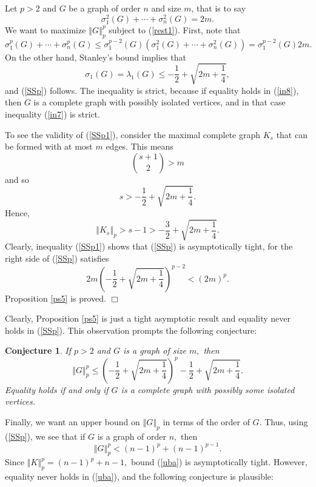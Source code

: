 \documentclass[12pt]{article}%
\newtheorem{conjecture}[theorem]{Conjecture}
\newenvironment{proof}[1][Proof]{\noindent{\textbf {#1}  }}  {\hfill$\Box$\bigskip}
\begin{document}
\begin{proof}
Let $p>2$ and $G$ be a graph of order $n$ and size $m$, that is to say
\begin{equation}
\sigma_{1}^{2}\left(  G\right)  +\cdots+\sigma_{n}^{2}\left(  G\right)  =2m.
\label{rest1}%
\end{equation}
We want to maximize $\left\Vert G\right\Vert _{p}^{p}$ subject to
(\ref{rest1}). First, note that
\begin{equation}
\sigma_{1}^{p}\left(  G\right)  +\cdots+\sigma_{n}^{p}\left(  G\right)
\leq\sigma_{1}^{p-2}\left(  G\right)  \left(  \sigma_{1}^{2}\left(  G\right)
+\cdots+\sigma_{n}^{2}\left(  G\right)  \right)  =\sigma_{1}^{p-2}\left(
G\right)  2m. \label{in7}%
\end{equation}
On the other hand, Stanley's bound \cite{Sta87} implies that
\begin{equation}
\sigma_{1}\left(  G\right)  =\lambda_{1}\left(  G\right)  \leq-\frac{1}%
{2}+\sqrt{2m+\frac{1}{4}}, \label{in8}%
\end{equation}
and (\ref{SSp}) follows. The inequality is strict, because if equality holds
in (\ref{in8}), then $G$ is a complete graph with possibly isolated vertices,
and in that case inequality (\ref{in7}) is strict.

To see the validity of (\ref{SSp1}), consider the maximal complete graph
$K_{s}$ that can be formed with at most $m$ edges. This means
\[
\binom{s+1}{2}>m
\]
and so%
\[
s>-\frac{1}{2}+\sqrt{2m+\frac{1}{4}}.
\]
Hence,
\[
\left\Vert K_{s}\right\Vert _{p}>s-1>-\frac{3}{2}+\sqrt{2m+\frac{1}{4}}.
\]
Clearly, inequality (\ref{SSp1}) shows that (\ref{SSp}) is asymptotically
tight, for the right side of (\ref{SSp}) satisfies
\[
2m\left(  -\frac{1}{2}+\sqrt{2m+\frac{1}{4}}\right)  ^{p-2}<\left(  2m\right)
^{p}.
\]
Proposition \ref{ps5} is proved.
\end{proof}

Clearly, Proposition \ref{ps5} is just a tight asymptotic result and equality
never holds in (\ref{SSp}). This observation prompts the following conjecture:

\begin{conjecture}
\label{con1}If $p>2$ and $G$ is a graph of size $m,$ then%
\[
\left\Vert G\right\Vert _{p}^{p}\leq\left(  -\frac{1}{2}+\sqrt{2m+\frac{1}{4}%
}\right)  ^{p}-\frac{1}{2}+\sqrt{2m+\frac{1}{4}}.
\]
Equality holds if and only if $G$ is a complete graph with possibly some
isolated vertices.
\end{conjecture}

Finally, we want an upper bound on $\left\Vert G\right\Vert _{p}$ in terms of
the order of $G.$ Thus, using (\ref{SSp}), we see that if $G$ is a graph of
order $n,$ then
\begin{equation}
\left\Vert G\right\Vert _{p}^{p}<\left(  n-1\right)  ^{p}+\left(  n-1\right)
^{p-1}. \label{uba}%
\end{equation}
Since $\left\Vert K\right\Vert _{p}^{p}=\left(  n-1\right)  ^{p}+n-1,$ bound
(\ref{uba}) is asymptotically tight. However, equality never holds in
(\ref{uba}), and the following conjecture is plausible:
\end{document}
